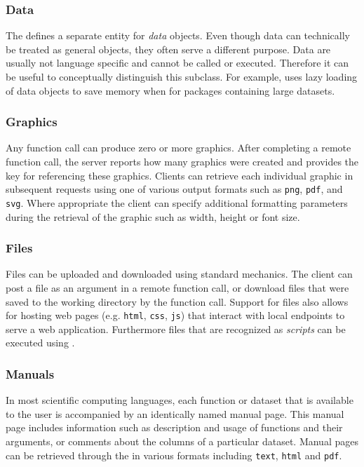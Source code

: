 \subsubsection{Data}

The \API defines a separate entity for \emph{data} objects. Even though data can technically be treated as general objects, they often serve a different purpose. Data are usually not language specific and cannot be called or executed. Therefore it can be useful to conceptually distinguish this subclass. For example, \R uses lazy loading of data objects to save memory when for packages containing large datasets.

\subsubsection{Graphics}

Any function call can produce zero or more graphics. After completing a remote function call, the server reports how many graphics were created and provides the key for referencing these graphics. Clients can retrieve each individual graphic in subsequent requests using one of various output formats such as \texttt{png}, \texttt{pdf}, and \texttt{svg}. Where appropriate the client can specify additional formatting parameters during the retrieval of the graphic such as width, height or font size.

\subsubsection{Files}

Files can be uploaded and downloaded using standard \HTTP mechanics. The client can post a file as an argument in a remote function call, or download files that were saved to the working directory by the function call. Support for files also allows for hosting web pages (e.g. \texttt{html}, \texttt{css}, \texttt{js}) that interact with local \API endpoints to serve a web application. Furthermore files that are recognized as \emph{scripts} can be executed using \RPC.

\subsubsection{Manuals}

In most scientific computing languages, each function or dataset that is available to the user is accompanied by an identically named manual page. This manual page includes information such as description and usage of functions and their arguments, or comments about the columns of a particular dataset. Manual pages can be retrieved through the \API in various formats including \texttt{text}, \texttt{html} and \texttt{pdf}.

